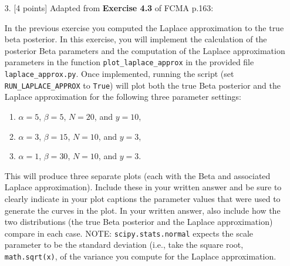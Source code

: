 \documentclass[10pt]{article}
\begin{document}
\begin{itemize}
\item[3.]  [4 points]
Adapted from {\bf Exercise 4.3} of FCMA p.163:

In the previous exercise you computed the Laplace approximation to the true beta posterior.  In this exercise, you will implement the calculation of the posterior Beta parameters and the computation of the Laplace approximation parameters in the function {\tt plot\_laplace\_approx} in the provided file {\tt laplace\_approx.py}. Once implemented, running the script (set {\tt RUN\_LAPLACE\_APPROX} to {\tt True}) will plot both the true Beta posterior and the Laplace approximation for the following three parameter settings:
\begin{enumerate}
\item $\alpha = 5$, $\beta = 5$, $N = 20$, and $y = 10$,
\item $\alpha = 3$, $\beta = 15$, $N = 10$, and $y = 3$,
\item $\alpha = 1$, $\beta = 30$, $N = 10$, and $y = 3$.
\end{enumerate}
This will produce three separate plots (each with the Beta and associated Laplace approximation). Include these in your written answer and be sure to clearly indicate in your plot captions the parameter values that were used to generate the curves in the plot. In your written answer, also include how the two distributions (the true Beta posterior and the Laplace approximation) compare in each case. NOTE: {\tt scipy.stats.normal} expects the scale parameter to be the standard deviation (i.e., take the square root, {\tt math.sqrt(x)}, of the variance you compute for the Laplace approximation.


\end{itemize}
\end{document}
